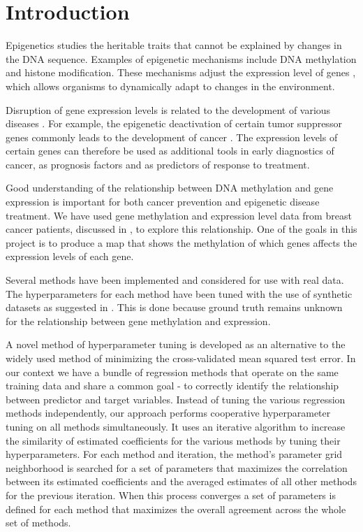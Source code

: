 \chapter{Introduction}
\setcounter{page}{1}
Epigenetics \cite{holliday2006epigenetics} studies the heritable traits that cannot be explained by changes in the DNA sequence. Examples of epigenetic mechanisms include DNA methylation and histone modification. These mechanisms adjust the expression level of genes \cite{jaenisch2003epigenetic}, which allows organisms to dynamically adapt to changes in the environment.

Disruption of gene expression levels is related to the development of various diseases \cite{egger2004epigenetics}. For example, the epigenetic deactivation of certain tumor suppressor genes commonly leads to the development of cancer \cite{esteller2008epigenetics}. The expression levels of certain genes can therefore be used as additional tools in early diagnostics of cancer, as prognosis factors and as predictors of response to treatment.

Good understanding of the relationship between DNA methylation and gene expression is important for both cancer prevention and epigenetic disease treatment. We have used gene methylation and expression level data from breast cancer patients, discussed in \cite{cancer2012comprehensive}, to explore this relationship. One of the goals in this project is to produce a map that shows the methylation of which genes affects the expression levels of each gene.

Several methods \cite{tibshirani1996regression,zou2005regularization,li2008network,li2010variable,pan2010incorporating,luo2012two,kim2013network} have been implemented and considered for use with real data. The hyperparameters for each method have been tuned with the use of synthetic datasets as suggested in \cite{li2008network}. This is done because ground truth remains unknown for the relationship between gene methylation and expression.

A novel method of hyperparameter tuning is developed as an alternative to the widely used method of minimizing the cross-validated mean squared test error. In our context we have a bundle of regression methods that operate on the same training data and share a common goal - to correctly identify the relationship between predictor and target variables. Instead of tuning the various regression methods independently, our approach performs cooperative hyperparameter tuning on all methods simultaneously. It uses an iterative algorithm to increase the similarity of estimated coefficients for the various methods by tuning their hyperparameters. For each method and iteration, the method's parameter grid neighborhood is searched for a set of parameters that maximizes the correlation between its estimated coefficients and the averaged estimates of all other methods for the previous iteration. When this process converges a set of parameters is defined for each method that maximizes the overall agreement across the whole set of methods.

